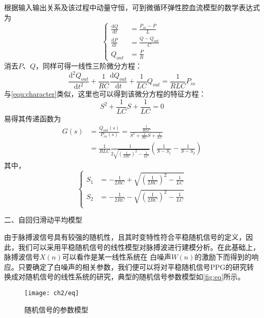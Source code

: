 根据输入输出关系及该过程中动量守恒，可到微循环弹性腔血流模型的数学表达式为
\begin{equation}
    \label{equ:wxh1}
    \left \{
    \begin{aligned}
        \frac{\mathrm{d} Q}{\mathrm{d} t} &=\frac{P_{in}-P}{L}\\
        \frac{\mathrm{d} P}{\mathrm{d} t} &=\frac{Q-Q_{out}}{C}\\
        Q_{out} &=\frac{P}{R}
    \end{aligned}
    \right.
\end{equation}
消去$P$、$Q$，同样可得一线性三阶微分方程：
\begin{equation}
    \label{equ:wxh2}
    \frac{\mathrm{d^2} Q_{out}}{\mathrm{d} t^2}+\frac{1}{RC}\frac{\mathrm{d} Q_{out}}{\mathrm{d} t}+\frac{1}{LC}Q_{out}=\frac{1}{RLC}P_{in}
\end{equation}
与\autoref{equ:character}类似，这里也可以得到该微分方程的特征方程：
\begin{equation}
    \label{equ:character2}
    S^2+\frac{1}{LC}S+\frac{1}{LC}=0
\end{equation}
易得其传递函数为
\begin{equation}
    \label{equ:hs}
    \begin{aligned}
    G(s) &=\frac{Q_{out}(s)}{P_{in}(s)}=\frac{\frac{1}{RLC}}{S^2+\frac{1}{RC}S+\frac{1}{LC}} \\
    &=\frac{1}{RLC}\frac{1}{2\sqrt{(\frac{1}{2RC})^2-\frac{1}{LC}}}(\frac{1}{S-S_{1}}-\frac{1}{S-S_{2}})
    \end{aligned}
\end{equation}
其中，
\begin{equation}
    \label{equ:ss}
    \left \{
    \begin{aligned}
        S_{1} &= -\frac{1}{2RC}+\sqrt{(\frac{1}{2RC})^2-\frac{1}{LC}}\\
        S_{2} &= -\frac{1}{2RC}-\sqrt{(\frac{1}{2RC})^2-\frac{1}{LC}}\\
    \end{aligned}
    \right.
\end{equation}

二、自回归滑动平均模型

由于脉搏波信号具有较强的随机性，且其时变特性符合平稳随机信号的定义，因此，我们可以采用平稳随机信号的线性模型对脉搏波进行建模分析\cite{Qiu2012,PPGYY,Ma2015}。在此基础上，脉搏波信号$X(n)$可以看作是某一线性系统在
白噪声$W(n)$的激励下而得到的响应。只要确定了白噪声的相关参数，我们便可以将对平稳随机信号PPG的研究转换成对随机信号的线性系统的研究，典型的随机信号参数模型如\autoref{fig:eq}所示。
\begin{figure}[htbp]
    \centering
    \texttt{[image: ch2/eq]}
    \caption{\label{fig:eq}随机信号的参数模型}
\end{figure}

